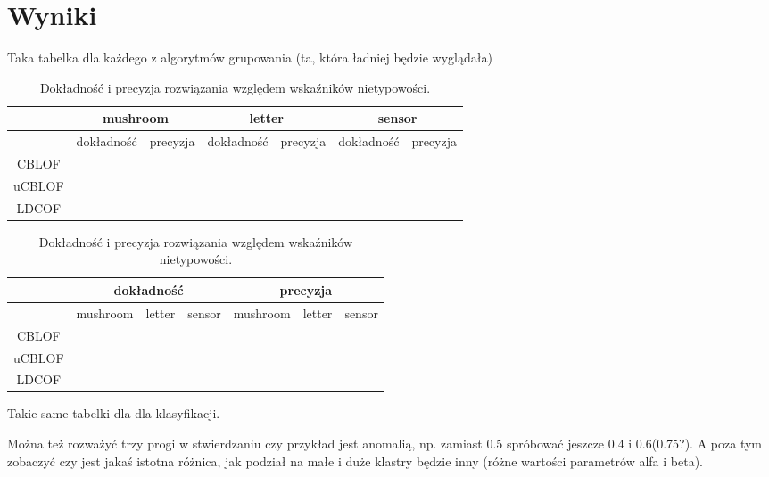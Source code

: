 \documentclass[11pt,a4paper,twoside]{article}
\begin{document}
\section{Wyniki}
Taka tabelka dla każdego z algorytmów grupowania (ta, która ładniej będzie wyglądała)
\begin{table}[ht]
\centering
\caption{Dokładność i precyzja rozwiązania względem wskaźników nietypowości.}
\label{accPrec_v1}
\begin{tabular}{|*{7}{c|}}
\hline
 & \multicolumn{2}{c|}{mushroom} & \multicolumn{2}{c|}{letter} & \multicolumn{2}{c|}{sensor} \\\hline
 & dokładność & precyzja & dokładność & precyzja & dokładność & precyzja \\\hline
 CBLOF & & & & & &\\\hline
 uCBLOF & & & & & &\\\hline
 LDCOF & & & & & &\\\hline
\end{tabular}
\end{table}


\begin{table}[ht]
\centering
\caption{Dokładność i precyzja rozwiązania względem wskaźników nietypowości.}
\label{accPrec_v2}
\begin{tabular}{|*{7}{c|}}
\hline
 & \multicolumn{3}{c|}{dokładność} & \multicolumn{3}{c|}{precyzja} \\\hline
 & mushroom & letter & sensor & mushroom & letter & sensor \\\hline
 CBLOF & & & & & &\\\hline
 uCBLOF & & & & & &\\\hline
 LDCOF & & & & & &\\\hline
\end{tabular}
\end{table}

Takie same tabelki dla dla klasyfikacji.

Można też rozważyć trzy progi w stwierdzaniu czy przykład jest anomalią, np. zamiast 0.5 spróbować jeszcze 0.4 i 0.6(0.75?). A poza tym zobaczyć czy jest jakaś istotna różnica, jak podział na małe i duże klastry będzie inny (różne wartości parametrów alfa i beta).
\end{document}
